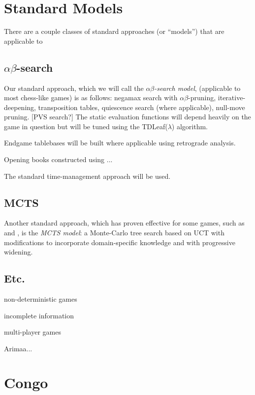 \documentclass[10pt,dvipdfmx,letterpaper]{report}
\newcommand{\ab}{{$\alpha\beta$}}
\newcommand{\g}[1]{{\sc{#1}}\index{{\sc{#1}}}}
\begin{document}
\chapter{Standard Models}
\label{chap-standard-models}

There are a couple classes of standard approaches (or ``models'') that
are applicable to 


\section{\ab-search}

Our standard approach, which we will call the {\em \ab-search model},
(applicable to most chess-like games) is as follows: negamax search with \ab-pruning, iterative-deepening,
transposition tables, quiescence search (where applicable), null-move pruning. [PVS search?]
The static evaluation functions will depend heavily on the game in question but will be
tuned using the TDLeaf($\lambda$) algorithm.

Endgame tablebases will be built where applicable using retrograde analysis.

Opening books constructed using ...

The standard time-management approach will be used.


\section{MCTS}

Another standard approach, which has proven effective for some games, such as \g{go} and \g{hex},
is the {\em MCTS model}: a Monte-Carlo tree search based on UCT with modifications to incorporate
domain-specific knowledge and with progressive widening.

\section{Etc.}

non-deterministic games

incomplete information

multi-player games

Arimaa...


\chapter{Congo}
\label{chap-congo}
\end{document}
